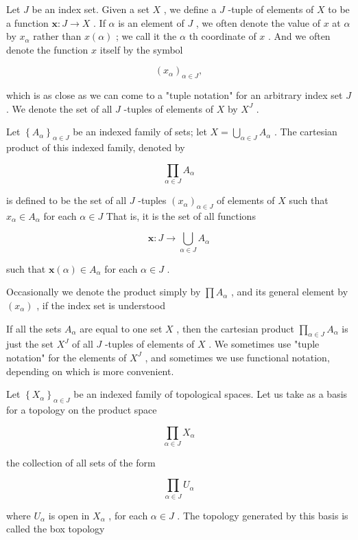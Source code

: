 \begin{definition} Let \(J\) be an index set. Given a set \(X\) , we define a \(J\) -tuple of elements of \(X\) to be a function \(\mathbf{x} : J \rightarrow  X\) . If \(\alpha\) is an element of \(J\) , we often denote the value of \(x\) at \(\alpha\) by \({x}_{\alpha }\) rather than \(x\left( \alpha \right)\) ; we call it the \(\alpha\) th coordinate of \(x\) . And we often denote the function \(x\) itself by the symbol

\[
{\left( {x}_{\alpha }\right) }_{\alpha  \in  J},
\]

which is as close as we can come to a "tuple notation" for an arbitrary index set \(J\) . We denote the set of all \(J\) -tuples of elements of \(X\) by \({X}^{J}\) .
\end{definition}

\begin{definition} Let \({\left\{  {A}_{\alpha }\right\}  }_{\alpha  \in  J}\) be an indexed family of sets; let \(X = \mathop{\bigcup }\limits_{{\alpha  \in  J}}{A}_{\alpha }\) . The cartesian product of this indexed family, denoted by

\[
\mathop{\prod }\limits_{{\alpha  \in  J}}{A}_{\alpha }
\]

is defined to be the set of all \(J\) -tuples \({\left( {x}_{\alpha }\right) }_{\alpha  \in  J}\) of elements of \(X\) such that \({x}_{\alpha } \in  {A}_{\alpha }\) for each \(\alpha  \in  J\) That is, it is the set of all functions

\[
\mathbf{x} : J \rightarrow  \mathop{\bigcup }\limits_{{\alpha  \in  J}}{A}_{\alpha }
\]

such that \(\mathbf{x}\left( \alpha \right)  \in  {A}_{\alpha }\) for each \(\alpha  \in  J\) .

Occasionally we denote the product simply by \(\prod {A}_{\alpha }\) , and its general element by \(\left( {x}_{\alpha }\right)\) , if the index set is understood
\end{definition}

If all the sets \({A}_{\alpha }\) are equal to one set \(X\) , then the cartesian product \(\mathop{\prod }\limits_{{\alpha  \in  J}}{A}_{\alpha }\) is just the set \({X}^{J}\) of all \(J\) -tuples of elements of \(X\) . We sometimes use "tuple notation" for the elements of \({X}^{J}\) , and sometimes we use functional notation, depending on which is more convenient.

\begin{definition} Let \({\left\{  {X}_{\alpha }\right\}  }_{\alpha  \in  J}\) be an indexed family of topological spaces. Let us take as a basis for a topology on the product space

\[
\mathop{\prod }\limits_{{\alpha  \in  J}}{X}_{\alpha }
\]

the collection of all sets of the form

\[
\mathop{\prod }\limits_{{\alpha  \in  J}}{U}_{\alpha }
\]

where \({U}_{\alpha }\) is open in \({X}_{\alpha }\) , for each \(\alpha  \in  J\) . The topology generated by this basis is called the box topology
\end{definition}

